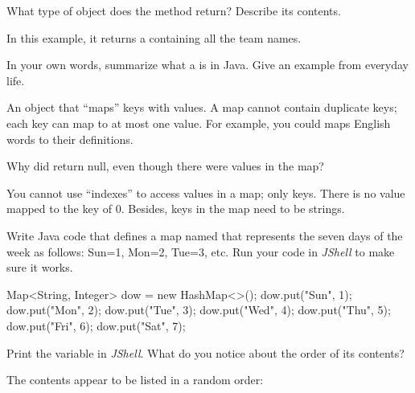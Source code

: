 \Q What type of object does the  method return? Describe its contents.

\begin{answer}[3em]
In this example, it returns a  containing all the team names.
\end{answer}


\Q \label{key2}
In your own words, summarize what a  is in Java.
Give an example from everyday life.

\begin{answer}
An object that ``maps'' keys with values.
A map cannot contain duplicate keys; each key can map to at most one value.
For example, you could maps English words to their definitions.
\end{answer}


\Q Why did  return null, even though there were values in the map?

\begin{answer}
You cannot use ``indexes'' to access values in a map; only keys.
There is no value mapped to the key of 0.
Besides, keys in the  map need to be strings.
\end{answer}


\Q \label{key3}
Write Java code that defines a map named  that represents the seven days of the week as follows: Sun=1, Mon=2, Tue=3, etc.
Run your code in \textit{JShell} to make sure it works.

\begin{answer}[12em]
\begin{javaans}
Map<String, Integer> dow = new HashMap<>();
dow.put("Sun", 1);
dow.put("Mon", 2);
dow.put("Tue", 3);
dow.put("Wed", 4);
dow.put("Thu", 5);
dow.put("Fri", 6);
dow.put("Sat", 7);
\end{javaans}
\end{answer}


\Q Print the  variable in \textit{JShell}.
What do you notice about the order of its contents?

\begin{answer}
The contents appear to be listed in a random order:

\medskip
\end{answer}
